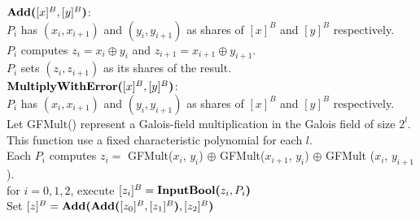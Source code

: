 \begin{protocol}
	$\textbf{Add(}[x]^B, [y]^B\textbf{)}$: \\
	\indent	$P_i$ has $(x_i, x_{i+1})$ and $(y_i, y_{i+1})$ as
		shares of $[x]^B$ and $[y]^B$ respectively. \\
	\indent $P_i$ computes $z_i = x_i \oplus y_i$ and $z_{i+1} = x_{i+1} \oplus y_{i+1}$.\\
	\indent $P_i$ sets $(z_i, z_{i+1})$ as its shares of the result.\\

	\noindent $\textbf{MultiplyWithError(}[x]^B, [y]^B\textbf{)}$: \\
	\indent	$P_i$ has $(x_i, x_{i+1})$ and $(y_i, y_{i+1})$ as
		shares of $[x]^B$ and $[y]^B$ respectively. \\
	\indent Let GFMult() represent a Galois-field multiplication 
		in the Galois field of size $2^l$.
		This function use a fixed characteristic polynomial for each $l$.\\
	\indent Each $P_i$ computes $z_i = $ GFMult($x_i$, $y_i$) $\oplus$ 
			GFMult($x_{i+1}$, $y_i$) $\oplus$ GFMult ($x_i$, $y_{i+1}$). \\
	\indent for $i = 0, 1, 2$, execute $[z_i]^B = \textbf{InputBool(}z_i, P_i\textbf{)}$\\
	\indent Set $[z]^B = \textbf{Add(}\textbf{Add(}[z_0]^B, [z_1]^B\textbf{)}, [z_2]^B\textbf{)} $\\	
\end{protocol}

